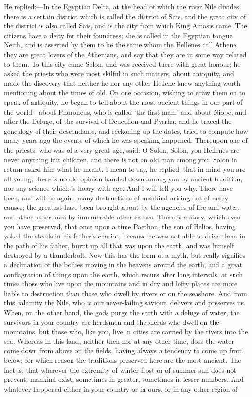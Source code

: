 \documentclass[11pt,letter]{article}
\begin{document}
\par  He replied:—In the Egyptian Delta, at the head of which the river Nile divides, there is a certain district which is called the district of Sais, and the great city of the district is also called Sais, and is the city from which King Amasis came. The citizens have a deity for their foundress; she is called in the Egyptian tongue Neith, and is asserted by them to be the same whom the Hellenes call Athene; they are great lovers of the Athenians, and say that they are in some way related to them. To this city came Solon, and was received there with great honour; he asked the priests who were most skilful in such matters, about antiquity, and made the discovery that neither he nor any other Hellene knew anything worth mentioning about the times of old. On one occasion, wishing to draw them on to speak of antiquity, he began to tell about the most ancient things in our part of the world—about Phoroneus, who is called ‘the first man,’ and about Niobe; and after the Deluge, of the survival of Deucalion and Pyrrha; and he traced the genealogy of their descendants, and reckoning up the dates, tried to compute how many years ago the events of which he was speaking happened. Thereupon one of the priests, who was of a very great age, said: O Solon, Solon, you Hellenes are never anything but children, and there is not an old man among you. Solon in return asked him what he meant. I mean to say, he replied, that in mind you are all young; there is no old opinion handed down among you by ancient tradition, nor any science which is hoary with age. And I will tell you why. There have been, and will be again, many destructions of mankind arising out of many causes; the greatest have been brought about by the agencies of fire and water, and other lesser ones by innumerable other causes. There is a story, which even you have preserved, that once upon a time Paethon, the son of Helios, having yoked the steeds in his father’s chariot, because he was not able to drive them in the path of his father, burnt up all that was upon the earth, and was himself destroyed by a thunderbolt. Now this has the form of a myth, but really signifies a declination of the bodies moving in the heavens around the earth, and a great conflagration of things upon the earth, which recurs after long intervals; at such times those who live upon the mountains and in dry and lofty places are more liable to destruction than those who dwell by rivers or on the seashore. And from this calamity the Nile, who is our never-failing saviour, delivers and preserves us. When, on the other hand, the gods purge the earth with a deluge of water, the survivors in your country are herdsmen and shepherds who dwell on the mountains, but those who, like you, live in cities are carried by the rivers into the sea. Whereas in this land, neither then nor at any other time, does the water come down from above on the fields, having always a tendency to come up from below; for which reason the traditions preserved here are the most ancient. The fact is, that wherever the extremity of winter frost or of summer sun does not prevent, mankind exist, sometimes in greater, sometimes in lesser numbers. And whatever happened either in your country or in ours, or in any other region of 
\end{document}
